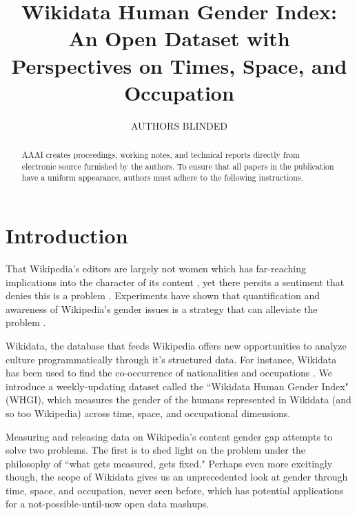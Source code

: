 \documentclass[letterpaper]{article}
\begin{document}
%
\title{Wikidata Human Gender Index: An Open Dataset with Perspectives on Times, Space, and Occupation}

\author{AUTHORS BLINDED}
    
\maketitle
\begin{abstract}
AAAI creates proceedings, working notes, and technical reports directly from electronic source furnished by the authors. To ensure that all papers in the publication have a uniform appearance, authors must adhere to the following instructions. 
\end{abstract}


\section{Introduction}
That Wikipedia's editors are largely not women \cite{hill_wikipedia_2013} which has far-reaching implications into the character of its content \cite{graells-garrido_first_2015} \cite{wagner_its_2015}, yet there persits a sentiment that denies this is a problem \cite{eckert_retriggering_2013}. Experiments have shown that quantification and awareness of Wikipedia's gender issues is a strategy that can alleviate the problem \cite{hinnosaar_gender_2015}.

Wikidata, the database that feeds Wikipedia \cite{vrandecic_wikidata:_2014} offers new opportunities to analyze culture programmatically through it's structured data. For instance, Wikidata has been used to find the co-occurrence of nationalities and occupations \cite{goldfarb_quantifying_2015}. We introduce a weekly-updating dataset called the ``Wikidata Human Gender Index" (WHGI), which measures the gender of the humans represented in Wikidata (and so too Wikipedia) across time, space, and occupational dimensions. 

Measuring and releasing data on Wikipedia's content gender gap attempts to solve two problems. The first is to shed light on the problem under the philosophy of ``what gets measured, gets fixed." Perhaps even more excitingly though, the scope of Wikidata gives us an unprecedented look at gender through time, space, and occupation, never seen before, which has potential applications for a not-possible-until-now open data mashups.
\end{document}
